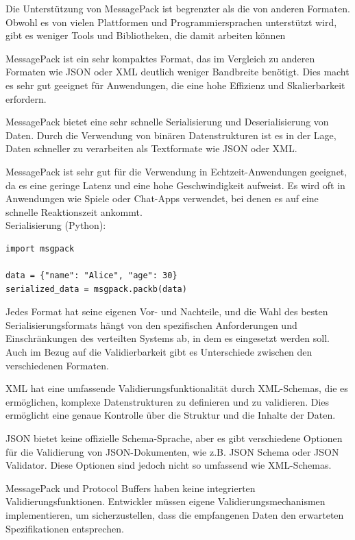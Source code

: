 Die Unterstützung von MessagePack ist begrenzter als die von anderen Formaten. Obwohl es von vielen Plattformen und Programmiersprachen unterstützt wird, gibt es weniger Tools und Bibliotheken, die damit arbeiten können

MessagePack ist ein sehr kompaktes Format, das im Vergleich zu anderen Formaten wie JSON oder XML deutlich weniger Bandbreite benötigt. Dies macht es sehr gut geeignet für Anwendungen, die eine hohe Effizienz und Skalierbarkeit erfordern.

MessagePack bietet eine sehr schnelle Serialisierung und Deserialisierung von Daten. Durch die Verwendung von binären Datenstrukturen ist es in der Lage, Daten schneller zu verarbeiten als Textformate wie JSON oder XML.

MessagePack ist sehr gut für die Verwendung in Echtzeit-Anwendungen geeignet, da es eine geringe Latenz und eine hohe Geschwindigkeit aufweist. Es wird oft in Anwendungen wie Spiele oder Chat-Apps verwendet, bei denen es auf eine schnelle Reaktionszeit ankommt.\\
Serialisierung (Python):\\
\begin{lstlisting}[caption={MessagePack},captionpos=b,label={lst:msgpack}]
import msgpack

data = {"name": "Alice", "age": 30}
serialized_data = msgpack.packb(data)
\end{lstlisting}

Jedes Format hat seine eigenen Vor- und Nachteile, und die Wahl des besten Serialisierungsformats hängt von den spezifischen Anforderungen und Einschränkungen des verteilten Systems ab, in dem es eingesetzt werden soll.
Auch im Bezug auf die Validierbarkeit gibt es Unterschiede zwischen den verschiedenen Formaten.

XML hat eine umfassende Validierungsfunktionalität durch XML-Schemas, die es ermöglichen, komplexe Datenstrukturen zu definieren und zu validieren. Dies ermöglicht eine genaue Kontrolle über die Struktur und die Inhalte der Daten.

JSON bietet keine offizielle Schema-Sprache, aber es gibt verschiedene Optionen für die Validierung von JSON-Dokumenten, wie z.B. JSON Schema oder JSON Validator. Diese Optionen sind jedoch nicht so umfassend wie XML-Schemas.

MessagePack und Protocol Buffers haben keine integrierten Validierungsfunktionen. Entwickler müssen eigene Validierungsmechanismen implementieren, um sicherzustellen, dass die empfangenen Daten den erwarteten Spezifikationen entsprechen.


